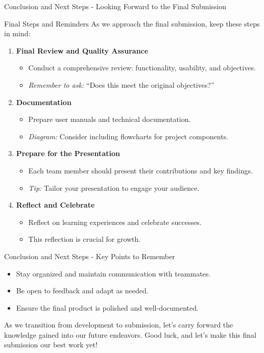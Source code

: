 \documentclass[aspectratio=169]{beamer}
\begin{document}
\begin{frame}[fragile]{Conclusion and Next Steps - Looking Forward to the Final Submission}
  \begin{block}{Final Steps and Reminders}
    As we approach the final submission, keep these steps in mind:
  \end{block}

  \begin{enumerate}
    \item \textbf{Final Review and Quality Assurance}
    \begin{itemize}
      \item Conduct a comprehensive review: functionality, usability, and objectives.
      \item \emph{Remember to ask:} ``Does this meet the original objectives?''
    \end{itemize}

    \item \textbf{Documentation}
    \begin{itemize}
      \item Prepare user manuals and technical documentation.
      \item \emph{Diagram:} Consider including flowcharts for project components.
    \end{itemize}

    \item \textbf{Prepare for the Presentation}
    \begin{itemize}
      \item Each team member should present their contributions and key findings.
      \item \emph{Tip:} Tailor your presentation to engage your audience.
    \end{itemize}

    \item \textbf{Reflect and Celebrate}
    \begin{itemize}
      \item Reflect on learning experiences and celebrate successes.
      \item This reflection is crucial for growth.
    \end{itemize}
  \end{enumerate}
\end{frame}

\begin{frame}[fragile]{Conclusion and Next Steps - Key Points to Remember}
  \begin{itemize}
    \item Stay organized and maintain communication with teammates.
    \item Be open to feedback and adapt as needed.
    \item Ensure the final product is polished and well-documented.
  \end{itemize}

  As we transition from development to submission, let's carry forward the knowledge gained into our future endeavors. Good luck, and let’s make this final submission our best work yet!
\end{frame}
\end{document}
